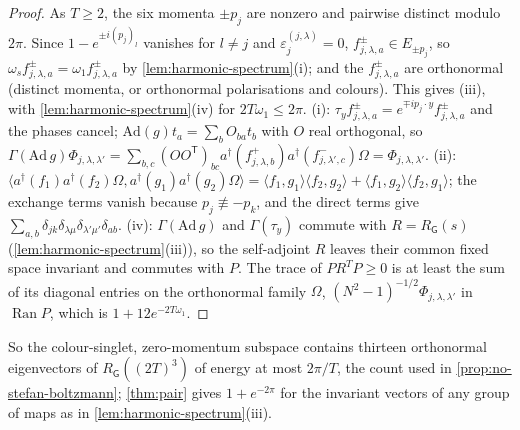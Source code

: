 \documentclass[11pt,a4paper]{amsart}
\theoremstyle{definition}
\theoremstyle{remark}
\numberwithin{equation}{section}
\newcommand{\ip}[2]{\langle #1,#2\rangle}  %
\newcommand{\cube}[1]{(2#1)^3}             %
\newcommand{\Gharm}{\mathsf{G}}            %
\begin{document}
\begin{proof}
As $T\ge2$, the six momenta $\pm p_j$ are nonzero and pairwise distinct modulo $2\pi$. Since $1-e^{\pm i(p_j)_l}$ vanishes for $l\ne j$ and $\varepsilon^{(j,\lambda)}_j=0$, $f^{\pm}_{j,\lambda,a}\in E_{\pm p_j}$, so $\omega_sf^{\pm}_{j,\lambda,a}=\omega_1f^{\pm}_{j,\lambda,a}$ by \cref{lem:harmonic-spectrum}(i); and the $f^{\pm}_{j,\lambda,a}$ are orthonormal (distinct momenta, or orthonormal polarisations and colours). This gives (iii), with \cref{lem:harmonic-spectrum}(iv) for $2T\omega_1\le2\pi$. (i): $\tau_yf^{\pm}_{j,\lambda,a}=e^{\mp ip_j\cdot y}f^{\pm}_{j,\lambda,a}$ and the phases cancel; $\mathrm{Ad}(g)t_a=\sum_bO_{ba}t_b$ with $O$ real orthogonal, so $\Gamma(\mathrm{Ad}\,g)\Phi_{j,\lambda,\lambda'}=\sum_{b,c}(OO^{\mathsf T})_{bc}a^\dagger(f^{+}_{j,\lambda,b})a^\dagger(f^{-}_{j,\lambda',c})\Omega=\Phi_{j,\lambda,\lambda'}$. (ii): $\ip{a^\dagger(f_1)a^\dagger(f_2)\Omega}{a^\dagger(g_1)a^\dagger(g_2)\Omega}=\ip{f_1}{g_1}\ip{f_2}{g_2}+\ip{f_1}{g_2}\ip{f_2}{g_1}$; the exchange terms vanish because $p_j\not\equiv-p_k$, and the direct terms give $\sum_{a,b}\delta_{jk}\delta_{\lambda\mu}\delta_{\lambda'\mu'}\delta_{ab}$. (iv): $\Gamma(\mathrm{Ad}\,g)$ and $\Gamma(\tau_y)$ commute with $R=R_{\Gharm}(s)$ (\cref{lem:harmonic-spectrum}(iii)), so the self-adjoint $R$ leaves their common fixed space invariant and commutes with $P$. The trace of $PR^TP\ge0$ is at least the sum of its diagonal entries on the orthonormal family $\Omega$, $(N^2-1)^{-1/2}\Phi_{j,\lambda,\lambda'}$ in $\operatorname{Ran}P$, which is $1+12e^{-2T\omega_1}$.
\end{proof}

So the colour-singlet, zero-momentum subspace contains thirteen orthonormal eigenvectors of $R_{\Gharm}(\cube{T})$ of energy at most $2\pi/T$, the count used in \cref{prop:no-stefan-boltzmann}; \cref{thm:pair} gives $1+e^{-2\pi}$ for the invariant vectors of any group of maps as in \cref{lem:harmonic-spectrum}(iii).
\end{document}
